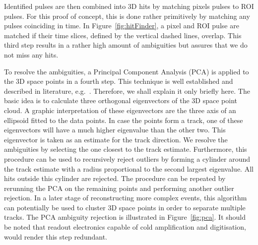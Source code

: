 \documentclass[a4paper]{article}
\begin{document}
Identified pulses are then combined into 3D hits by matching pixels pulses to ROI pulses.
For this proof of concept, this is done rather primitively by matching any pulses coinciding in time.
In Figure~\ref{fig:hitFinder}, a pixel and ROI pulse are matched if their time slices, defined by the vertical dashed lines, overlap.
This third step results in a rather high amount of ambiguities but assures that we do not miss any hits.

To resolve the ambiguities, a Principal Component Analysis (PCA) is applied to the 3D space points in a fourth step.
This technique is well established and described in literature, e.g.~\cite{pca}.
Therefore, we shall explain it only briefly here.
The basic idea is to calculate three orthogonal eigenvectors of the 3D space point cloud.
A graphic interpretation of these eigenvectors are the three axis of an ellipsoid fitted to the data points.
In case the points form a track, one of these eigenvectors will have a much higher eigenvalue than the other two.
This eigenvector is taken as an estimate for the track direction.
We resolve the ambiguities by selecting the one closest to the track estimate.
Furthermore, this procedure can be used to recursively reject outliers by forming a cylinder around the track estimate with a radius proportional to the second largest eigenvalue.
All hits outside this cylinder are rejected.
The procedure can be repeated by rerunning the PCA on the remaining points and performing another outlier rejection.
In a later stage of reconstructing more complex events, this algorithm can potentially be used to cluster 3D space points in order to separate multiple tracks.
The PCA ambiguity rejection is illustrated in Figure~\ref{fig:pca}.
It should be noted that readout electronics capable of cold amplification and digitisation, would render this step redundant. 
\end{document}
